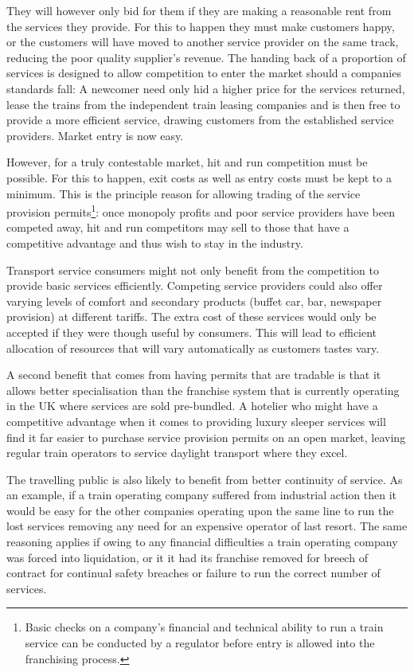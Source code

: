 They will however only bid for them if they are making a reasonable rent from the services they provide. For this to happen they must make customers happy, or the customers will have moved to another service provider on the same track, reducing the poor quality supplier's revenue. The handing back of a proportion of services is designed to allow competition to enter the market should a companies standards fall: A newcomer need only hid a higher price for the services returned, lease the trains from the independent train leasing companies and is then free to provide a more efficient service, drawing customers from the established service providers. Market entry is now easy.

However, for a truly contestable market, hit and run competition must be possible. For this to happen, exit costs as well as entry costs must be kept to a minimum. This is the principle reason for allowing trading of the service provision permits\footnote{Basic checks on a company's financial and technical ability to run a train service can be conducted by a regulator before entry is allowed into the franchising process.}: once monopoly profits and poor service providers have been competed away, hit and run competitors may sell to those that have a competitive advantage and thus wish to stay in the industry.

Transport service consumers might not only benefit from the competition to provide basic services efficiently. Competing service providers could also offer varying levels of comfort and secondary products (buffet car, bar, newspaper provision) at different tariffs. The extra cost of these services would only be accepted if they were though useful by consumers. This will lead to efficient allocation of resources that will vary automatically as customers tastes vary.

A second benefit that comes from having permits that are tradable is that it allows better specialisation than the franchise system that is currently operating in the UK where services are sold pre-bundled. A hotelier who might have a competitive advantage when it comes to providing luxury sleeper services will find it far easier to purchase service provision permits on an open market, leaving regular train operators to service daylight transport where they excel.

The travelling public is also likely to benefit from better continuity of service. As an example, if a train operating company suffered from industrial action then it would be easy for the other companies operating upon the same line to run the lost services removing any need for an expensive operator of last resort. The same reasoning applies if owing to any financial difficulties a train operating company was forced into liquidation, or it it had its franchise removed for breech of contract for continual safety breaches or failure to run the correct number of services.

